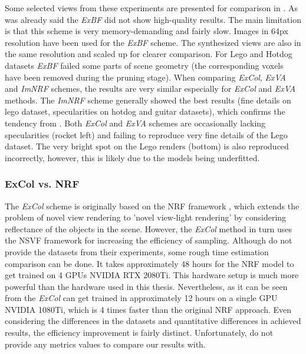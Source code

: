 Some selected views from these experiments are presented for comparison in .
As was already said the \textit{ExBF} did not show high-quality results.
The main limitation is that this scheme is very memory-demanding and fairly slow.
Images in 64px resolution have been used for the \textit{ExBF} scheme.
The synthesized views are also in the same resolution and scaled up for clearer comparison.
For Lego and Hotdog datasets \textit{ExBF} failed some parts of scene geometry 
(the corresponding voxels have been removed during the pruning stage).
When comparing \textit{ExCol}, \textit{ExVA} and \textit{ImNRF} schemes,
the results are very similar especially for \textit{ExCol} and \textit{ExVA} methods.
The \textit{ImNRF} scheme generally showed the best results
(fine details on lego dataset, specularities on hotdog and guitar datasets),
which confirms the tendency from .
Both \textit{ExCol} and \textit{ExVA} schemes are occasionally lacking specularities (rocket left)
and failing to reproduce very fine details of the Lego dataset.
The very bright spot on the Lego renders (bottom) is also reproduced incorrectly,
however, this is likely due to the models being underfitted.

\subsubsection{ExCol vs. NRF}

The \textit{ExCol} scheme is originally based on the NRF framework \cite{bi2020neural},
which extends the problem of novel view rendering to
'novel view-light rendering' by considering reflectance of the objects in the scene.
However, the \textit{ExCol} method in turn uses the NSVF framework for increasing the efficiency of sampling.
Although \cite{bi2020neural} do not provide the datasets from their experiments,
some rough time estimation comparison can be done.
It takes approximately 48 hours for the NRF model to get trained on 4 GPUs NVIDIA RTX 2080Ti.
This hardware setup is much more powerful than the hardware used in this thesis.
Nevertheless, as it can be seen from 
the \textit{ExCol} can get trained in approximately 12 hours on a single GPU NVIDIA 1080Ti,
which is $4$ times faster than the original NRF approach.
Even considering the differences in the datasets and quantitative differences in achieved results,
the efficiency improvement is fairly distinct.
Unfortunately, \cite{bi2020neural} do not provide any metrics values to compare our results with.




